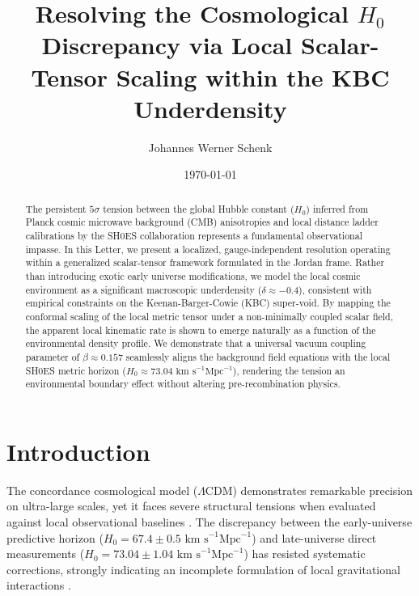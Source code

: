 \documentclass[aps,prl,reprint,superscriptaddress,nofootinbib,amsmath,amssymb]{revtex4-2}
\begin{document}
\title{Resolving the Cosmological $H_0$ Discrepancy via Local Scalar-Tensor Scaling within the KBC Underdensity}

\author{Johannes Werner Schenk}

\date{\today}

\begin{abstract}
The persistent $5\sigma$ tension between the global Hubble constant ($H_0$) inferred from Planck cosmic microwave background (CMB) anisotropies and local distance ladder calibrations by the SH0ES collaboration represents a fundamental observational impasse. In this Letter, we present a localized, gauge-independent resolution operating within a generalized scalar-tensor framework formulated in the Jordan frame. Rather than introducing exotic early universe modifications, we model the local cosmic environment as a significant macroscopic underdensity ($\delta \approx -0.4$), consistent with empirical constraints on the Keenan-Barger-Cowie (KBC) super-void. By mapping the conformal scaling of the local metric tensor under a non-minimally coupled scalar field, the apparent local kinematic rate is shown to emerge naturally as a function of the environmental density profile. We demonstrate that a universal vacuum coupling parameter of $\beta \approx 0.157$ seamlessly aligns the background field equations with the local SH0ES metric horizon ($H_0 \approx 73.04 \text{ km s}^{-1}\text{Mpc}^{-1}$), rendering the tension an environmental boundary effect without altering pre-recombination physics.
\end{abstract}

\maketitle

\section{Introduction}
The concordance cosmological model ($\Lambda$CDM) demonstrates remarkable precision on ultra-large scales, yet it faces severe structural tensions when evaluated against local observational baselines \cite{Planck2018}. The discrepancy between the early-universe predictive horizon ($H_0 = 67.4 \pm 0.5 \text{ km s}^{-1}\text{Mpc}^{-1}$) and late-universe direct measurements ($H_0 = 73.04 \pm 1.04 \text{ km s}^{-1}\text{Mpc}^{-1}$) has resisted systematic corrections, strongly indicating an incomplete formulation of local gravitational interactions \cite{Riess2022}.
\end{document}
